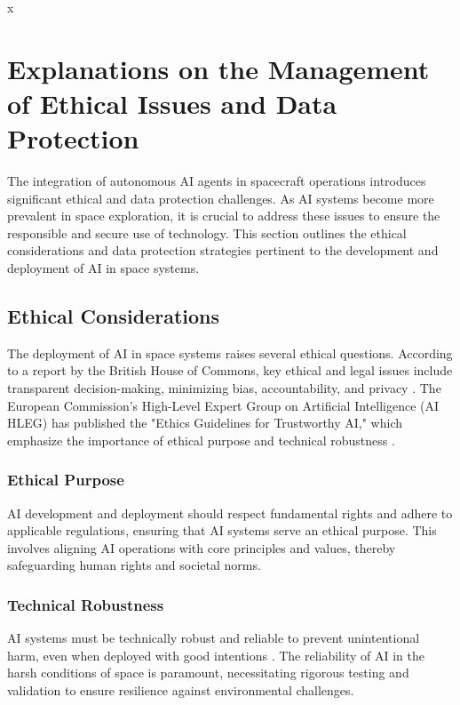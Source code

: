 \documentclass[a4paper,12pt]{article}
\begin{document}
x
\section{Explanations on the Management of Ethical Issues and Data Protection}

The integration of autonomous AI agents in spacecraft operations introduces significant ethical and data protection challenges. As AI systems become more prevalent in space exploration, it is crucial to address these issues to ensure the responsible and secure use of technology. This section outlines the ethical considerations and data protection strategies pertinent to the development and deployment of AI in space systems.

\subsection{Ethical Considerations}

The deployment of AI in space systems raises several ethical questions. According to a report by the British House of Commons, key ethical and legal issues include transparent decision-making, minimizing bias, accountability, and privacy \cite{british_report_325}. The European Commission's High-Level Expert Group on Artificial Intelligence (AI HLEG) has published the "Ethics Guidelines for Trustworthy AI," which emphasize the importance of ethical purpose and technical robustness \cite{eu_guidelines_344}.

\subsubsection{Ethical Purpose}

AI development and deployment should respect fundamental rights and adhere to applicable regulations, ensuring that AI systems serve an ethical purpose. This involves aligning AI operations with core principles and values, thereby safeguarding human rights and societal norms.

\subsubsection{Technical Robustness}

AI systems must be technically robust and reliable to prevent unintentional harm, even when deployed with good intentions \cite{eu_guidelines_344}. The reliability of AI in the harsh conditions of space is paramount, necessitating rigorous testing and validation to ensure resilience against environmental challenges.
\end{document}
